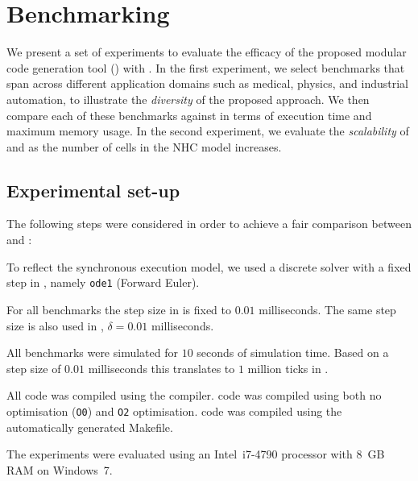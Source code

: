 \section{Benchmarking}
\label{sec:benchmarking}


We present a set of experiments to evaluate the efficacy of the proposed modular code generation tool (\ourTool) with \simulink. 
In the first experiment, we select benchmarks that span across different application domains such as medical, physics, and industrial automation, to illustrate the \emph{diversity} of the proposed approach.
We then compare each of these benchmarks against \simulink in terms of execution time and maximum memory usage.
In the second experiment, we evaluate the \emph{scalability} of \ourTool and \simulink as the number of cells in the \ac{NHC} model increases. 


\subsection{Experimental set-up}
\label{sec:experimentalSetUp}
The following steps were considered in order to achieve a fair comparison between \ourTool and \simulink:

\begin{description}
	\item[\textbf{Solver}] To reflect the synchronous execution model, we used a discrete solver with a fixed step in \simulink, namely \texttt{ode1} (Forward Euler).
	
	\item[\textbf{Step Size}] For all benchmarks the step size in \simulink is fixed to $0.01$ milliseconds.
	The same step size is also used in \ourTool, $\delta = 0.01$ milliseconds.
	
	\item[\textbf{Time}] All benchmarks were simulated for $10$ seconds of simulation time.
	Based on a step size of $0.01$ milliseconds this translates to $1$ million ticks in \ourTool.
	
	\item[\textbf{Compiler}] All code was compiled using the \compiler compiler.
	\ourTool code was compiled using both no optimisation (\texttt{O0}) and \texttt{O2} optimisation.
	\simulink code was compiled using the automatically generated Makefile.
\end{description}

The experiments were evaluated using an Intel~i7-4790 processor with 8~GB RAM on Windows~7. 



